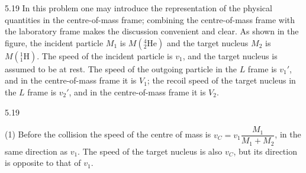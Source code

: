 \begin{solution}{5.19}
In this problem one may introduce the representation of the physical quantities in the
centre-of-mass frame; combining the centre-of-mass frame with the laboratory frame makes the
discussion convenient and clear. As shown in the figure, the incident particle $M_1$ is
$M({}^{4}_{2}\mathrm{He})$ and the target nucleus $M_2$ is $M({}^{1}_{1}\mathrm{H})$. The speed of
the incident particle is $v_1$, and the target nucleus is assumed to be at rest. The speed of the
outgoing particle in the $L$ frame is $v_1'$, and in the centre-of-mass frame it is $V_1$; the
recoil speed of the target nucleus in the $L$ frame is $v_2'$, and in the centre-of-mass frame
it is $V_2$.

\begin{figbox}{5.19}
\end{figbox}

(1) Before the collision the speed of the centre of mass is
$v_C=v_1\dfrac{M_1}{M_1+M_2}$, in the same direction as $v_1$. The speed of the target nucleus is
also $v_C$, but its direction is opposite to that of $v_1$.


\end{solution}
